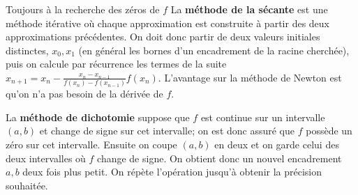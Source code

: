 \documentclass{exam}
\begin{document}
\begin{questions}
\question
Toujours à la recherche des zéros de $f$ La {\bf méthode de la sécante} est une méthode itérative où chaque approximation est construite à partir des deux approximations précédentes. On doit donc partir de deux valeurs initiales distinctes, $x_0, x_1$ (en général les bornes d'un encadrement de la racine cherchée), puis on calcule par récurrence les termes de la suite $x_{n+1} = x_n - \frac{x_n - x_{n-1}}{f(x_n) - f(x_{n-1})}f(x_n)$. L'avantage sur la méthode de Newton est qu'on n'a pas besoin de la dérivée de $f$.

\question
La {\bf méthode de dichotomie} suppose que $f$ est continue sur un intervalle $(a, b)$ et change de signe sur cet intervalle; on est donc assuré que $f$ possède un zéro sur cet intervalle. Ensuite on coupe $(a, b)$ en deux et on garde celui des deux intervalles où $f$ change de signe. On obtient donc un nouvel encadrement $a, b$ deux fois plus petit. On répète l'opération jusqu'à obtenir la précision souhaitée.


\end{questions}
\end{document}
